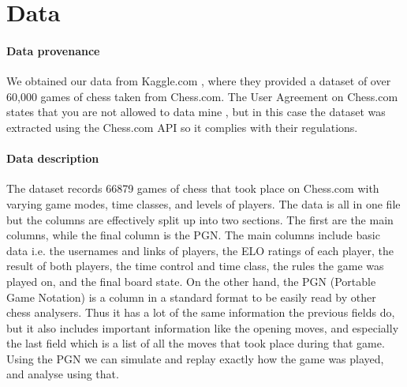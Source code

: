 \documentclass[10pt,a4paper,twocolumn]{article}
\begin{document}
\section{Data}


\paragraph{Data provenance}
We obtained our data from Kaggle.com \cite{Kaggle}, where they provided a dataset of over 60,000 games of chess taken from Chess.com. The User Agreement on Chess.com states that you are not allowed to data mine \cite{ChessT&C}, but in this case the dataset was extracted using the Chess.com API so it complies with their regulations.

\paragraph{Data description}
The dataset records 66879 games of chess that took place on Chess.com with varying game modes, time classes, and levels of players. The data is all in one file but the columns are effectively split up into two sections. The first are the main columns, while the final column is the PGN. The main columns include basic data i.e. the usernames and links of players, the ELO ratings of each player, the result of both players, the time control and time class, the rules the game was played on, and the final board state. On the other hand, the PGN (Portable Game Notation) is a column in a standard format to be easily read by other chess analysers. Thus it has a lot of the same information the previous fields do, but it also includes important information like the opening moves, and especially the last field which is a list of all the moves that took place during that game. Using the PGN we can simulate and replay exactly how the game was played, and analyse using that.

\end{document}
